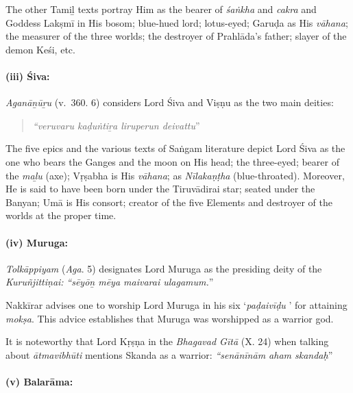 The other Tamiḻ texts portray Him as the bearer of \textit{śaṅkha} and \textit{cakra} and Goddess Lakṣmī in His bosom; blue-hued lord; lotus-eyed; Garuḍa as His \textit{vāhana}; the measurer of the three worlds; the destroyer of Prahlāda’s father; slayer of the demon Keśi, etc.


\paragraph*{(iii) Śiva:}

\vskip -6pt

\textit{Aganāṉūṟu} (v.~360. 6) considers Lord Śiva and Viṣṇu as the two main deities:

\begin{quote}
\textit{“veruvaru kaḍuṅtiṟa liruperun deivattu}”
\end{quote}

The five epics and the various texts of Saṅgam literature depict Lord Śiva as the one who bears the Ganges and the moon on His head; the three-eyed; bearer of the \textit{maḻu} (axe); Vṛṣabha is His \textit{vāhana}; as \textit{Nīlakaṇṭha} (blue-throated). Moreover, He is said to have been born under the Tiruvādirai star; seated under the Banyan; Umā is His consort; creator of the five Elements and destroyer of the worlds at the proper time.

\newpage


\paragraph*{(iv) Muruga:}

\vskip -7.5pt

\textit{Tolkāppiyam} (\textit{Aga}. 5) designates Lord Muruga as the presiding deity of the \textit{Kuruñjittiṇai:} \textit{“sēyōṉ mēya maivarai ulagamum.}”

Nakkīrar advises one to worship Lord Muruga in his six ‘\textit{paḍaivīḍu} ’ for attaining \textit{mokṣa}. This advice establishes that Muruga was worshipped as a warrior god.

It is noteworthy that Lord Kṛṣṇa in the \textit{Bhagavad Gītā} (X. 24) when talking about \textit{ātmavibhūti} mentions Skanda as a warrior: \textit{“senānīnām aham skandaḥ}”


\paragraph*{(v) Balarāma:}

